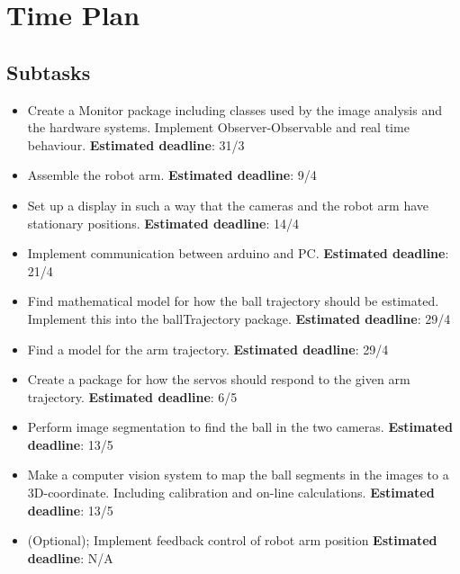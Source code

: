\documentclass{article}
\begin{document}
\section{Time Plan}
\subsection{Subtasks}
    \begin{itemize}
        \item Create a Monitor package including classes used by the image analysis and the hardware systems. Implement Observer-Observable and real time behaviour. \textbf{Estimated deadline}: 31/3
        \item Assemble the robot arm. \textbf{Estimated deadline}: 9/4
        \item Set up a display in such a way that the cameras and the robot arm have stationary positions. \textbf{Estimated deadline}: 14/4
        \item Implement communication between arduino and PC. \textbf{Estimated deadline}: 21/4
        \item Find mathematical model for how the ball trajectory should be estimated. Implement this into the ballTrajectory package. \textbf{Estimated deadline}: 29/4
        \item Find a model for the arm trajectory. \textbf{Estimated deadline}: 29/4 
        
        \item Create a package for how the servos should respond to the given arm trajectory. \textbf{Estimated deadline}: 6/5
        \item Perform image segmentation to find the ball in the two cameras. \textbf{Estimated deadline}: 13/5
        \item Make a computer vision system to map the ball segments in the images to a 3D-coordinate. Including calibration and on-line calculations. \textbf{Estimated deadline}: 13/5
        \item (Optional); Implement feedback control of robot arm position \textbf{Estimated deadline}: N/A
    \end{itemize}
    
\end{document}
